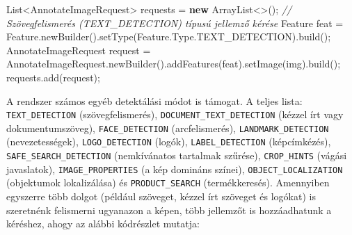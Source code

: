 \documentclass[
]{article}
\newenvironment{Shaded}{}{}
\newcommand{\BuiltInTok}[1]{\textcolor[rgb]{0.00,0.50,0.00}{#1}}
\newcommand{\CommentTok}[1]{\textcolor[rgb]{0.38,0.63,0.69}{\textit{#1}}}
\newcommand{\FunctionTok}[1]{\textcolor[rgb]{0.02,0.16,0.49}{#1}}
\newcommand{\KeywordTok}[1]{\textcolor[rgb]{0.00,0.44,0.13}{\textbf{#1}}}
\newcommand{\NormalTok}[1]{#1}
\newcommand{\OperatorTok}[1]{\textcolor[rgb]{0.40,0.40,0.40}{#1}}
\begin{document}
\begin{Shaded}
\begin{Highlighting}[]
\BuiltInTok{List}\OperatorTok{\textless{}}\NormalTok{AnnotateImageRequest}\OperatorTok{\textgreater{}}\NormalTok{ requests }\OperatorTok{=} \KeywordTok{new} \BuiltInTok{ArrayList}\OperatorTok{\textless{}\textgreater{}();}
\CommentTok{// Szövegfelismerés (TEXT\_DETECTION) típusú jellemző kérése}
\NormalTok{Feature feat }\OperatorTok{=}\NormalTok{ Feature}\OperatorTok{.}\FunctionTok{newBuilder}\OperatorTok{().}\FunctionTok{setType}\OperatorTok{(}\NormalTok{Feature}\OperatorTok{.}\FunctionTok{Type}\OperatorTok{.}\FunctionTok{TEXT\_DETECTION}\OperatorTok{).}\FunctionTok{build}\OperatorTok{();}
\NormalTok{AnnotateImageRequest request }\OperatorTok{=}
\NormalTok{        AnnotateImageRequest}\OperatorTok{.}\FunctionTok{newBuilder}\OperatorTok{().}\FunctionTok{addFeatures}\OperatorTok{(}\NormalTok{feat}\OperatorTok{).}\FunctionTok{setImage}\OperatorTok{(}\NormalTok{img}\OperatorTok{).}\FunctionTok{build}\OperatorTok{();}
\NormalTok{requests}\OperatorTok{.}\FunctionTok{add}\OperatorTok{(}\NormalTok{request}\OperatorTok{);}
\end{Highlighting}
\end{Shaded}

A rendszer számos egyéb detektálási módot is támogat. A teljes lista:
\texttt{TEXT\_DETECTION} (szövegfelismerés),
\texttt{DOCUMENT\_TEXT\_DETECTION} (kézzel írt vagy dokumentumszöveg),
\texttt{FACE\_DETECTION} (arcfelismerés), \texttt{LANDMARK\_DETECTION}
(nevezetességek), \texttt{LOGO\_DETECTION} (logók),
\texttt{LABEL\_DETECTION} (képcímkézés),
\texttt{SAFE\_SEARCH\_DETECTION} (nemkívánatos tartalmak szűrése),
\texttt{CROP\_HINTS} (vágási javaslatok), \texttt{IMAGE\_PROPERTIES} (a
kép domináns színei), \texttt{OBJECT\_LOCALIZATION} (objektumok
lokalizálása) és \texttt{PRODUCT\_SEARCH} (termékkeresés). Amennyiben
egyszerre több dolgot (például szöveget, kézzel írt szöveget és logókat)
is szeretnénk felismerni ugyanazon a képen, több jellemzőt is
hozzáadhatunk a kéréshez, ahogy az alábbi kódrészlet mutatja:
\end{document}
